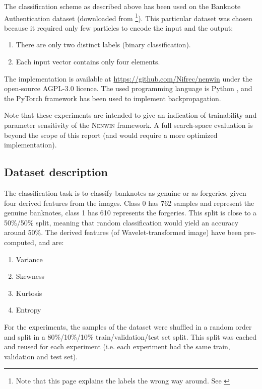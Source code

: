 The classification scheme as described above has been used on the Banknote Authentication dataset \cite{banknote_paper} (downloaded from \cite{banknote_download}\footnote{Note that this page explains the labels the wrong way around. See \cite{genuine_class_banknote}}).
This particular dataset was chosen because it required only few particles to encode the input and the output:
\begin{enumerate}
	\item There are only two distinct labels (binary classification).
	\item Each input vector contains only four elements.
\end{enumerate}

The implementation is available at \url{https://github.com/Nifrec/nenwin} under the open-source AGPL-3.0 licence\cite{AGPL_3}.
The used programming language is Python \cite{python}, and the PyTorch framework \cite{pytorch} has been used to implement backpropagation.

Note that these experiments are intended to give an indication of trainability and parameter sensitivity of the \textsc{Nenwin} framework. 
A full search-space evaluation is beyond the scope of this report (and would require a more optimized implementation).

\subsection{Dataset description}
The classification task is to classify banknotes as genuine or as forgeries, 
given four derived features from the images. 
Class 0 has 762 samples and represent the genuine banknotes,
class 1 has 610 represents the forgeries. 
This split is close to a 50\%/50\% split, meaning that random classification would yield an accuracy around 50\%.
The derived features (of Wavelet-transformed image) have been pre-computed, and are:
\begin{enumerate}
	\item Variance
	\item Skewness
	\item Kurtosis
	\item Entropy
\end{enumerate}

For the experiments, the samples of the dataset were shuffled in a random order and split in a 80\%/10\%/10\% train/validation/test set split. 
This split was cached and reused for each experiment (i.e. each experiment had the same train, validation and test set).

